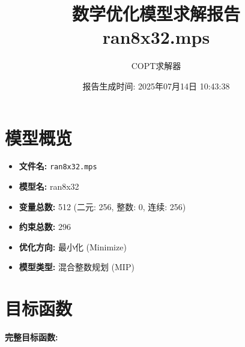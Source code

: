 \documentclass[a4paper,10pt]{article}
\title{数学优化模型求解报告\\{\large ran8x32.mps}}
\author{COPT求解器}
\date{报告生成时间: 2025年07月14日 10:43:38}
\begin{document}
\maketitle
\tableofcontents
\newpage

\section{模型概览}
\begin{itemize}
    \item \textbf{文件名:} \texttt{ran8x32.mps}
    \item \textbf{模型名:} ran8x32
    \item \textbf{变量总数:} 512 (二元: 256, 整数: 0, 连续: 256)
    \item \textbf{约束总数:} 296
    \item \textbf{优化方向:} 最小化 (Minimize)
    \item \textbf{模型类型:} 混合整数规划 (MIP)
\end{itemize}
\section{目标函数}

\textbf{完整目标函数:}
\end{document}
